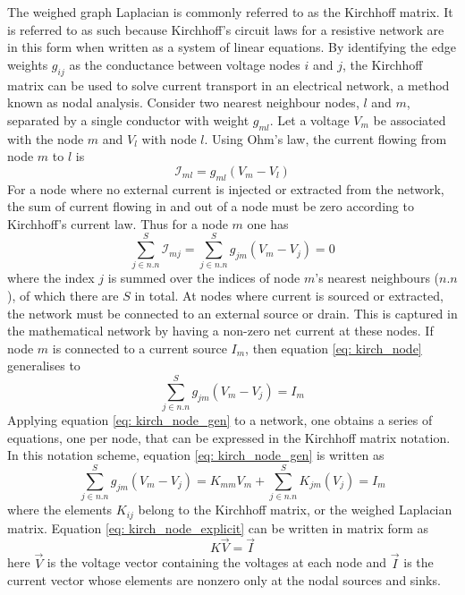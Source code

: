 The weighed graph Laplacian is commonly referred to as the Kirchhoff matrix. It is referred to as such because Kirchhoff's circuit laws for a resistive network are in this form when written as a system of linear equations. By identifying the edge weights $g_{\textit{ij}}$ as the conductance between voltage nodes $\textit{i}$ and $\textit{j}$, the Kirchhoff matrix can be used to solve current transport in an electrical network, a method known as nodal analysis\cite{strang1986,pozrikidis,vago1985}. Consider two nearest neighbour nodes, $\textit{l}$ and $\textit{m}$, separated by a single conductor with weight $g_{\textit{ml}}$. Let a voltage $V_\textit{m}$ be associated with the node $\textit{m}$ and $V_\textit{l}$ with node $\textit{l}$. Using Ohm's law, the current flowing from node $\textit{m}$ to $\textit{l}$ is
\begin{equation}
\mathcal{I}_{\textit{ml}} = g_{\textit{ml}}(V_\textit{m} - V_\textit{l})
\end{equation}
For a node where no external current is injected or extracted from the network, the sum of current flowing in and out of a node must be zero according to Kirchhoff's current law. Thus for a node $\textit{m}$ one has
\begin{equation}
\sum_{\textit{j} \in n.n}^S \mathcal{I}_{\textit{mj}} = \sum_{\textit{j} \in n.n}^S  g_{\textit{jm}}(V_\textit{m}-V_\textit{j})  = 0
\label{eq: kirch_node}
\end{equation}
where the index $\textit{j}$ is summed over the indices of node $\textit{m}$'s nearest neighbours ($n.n$), of which there are $S$ in total. At nodes where current is sourced or extracted, the network must be connected to an external source or drain. This is captured in the mathematical network by having a non-zero net current at these nodes. If node $\textit{m}$ is connected to a current source $I_\textit{m}$, then equation \ref{eq: kirch_node} generalises to  
\begin{equation}
\sum_{\textit{j} \in n.n}^S  g_{\textit{jm}}(V_\textit{m}-V_\textit{j}) = I_\textit{m}
\label{eq: kirch_node_gen}
\end{equation}
Applying equation \ref{eq: kirch_node_gen} to a network, one obtains a series of equations, one per node, that can be expressed in the Kirchhoff matrix notation. In this notation scheme, equation \ref{eq: kirch_node_gen} is written as
\begin{equation}
\sum_{\textit{j} \in n.n}^S  g_{\textit{jm}}(V_\textit{m}-V_\textit{j}) = K_\textit{mm} V_\textit{m} +  \sum_{\textit{j} \in n.n}^S  K_{\textit{jm}}(V_\textit{j}) = I_\textit{m}
\label{eq: kirch_node_explicit}
\end{equation}
where the elements $K_{ij}$ belong to the Kirchhoff matrix, or the weighed Laplacian matrix. Equation \ref{eq: kirch_node_explicit} can be written in matrix form as 
\begin{equation}
K\vec{V}=\vec{I}
\label{eq: Ohms}
\end{equation}
here $\vec{V}$ is the voltage vector containing the voltages at each node and $\vec{I}$ is the current vector whose elements are nonzero only at the nodal sources and sinks.

